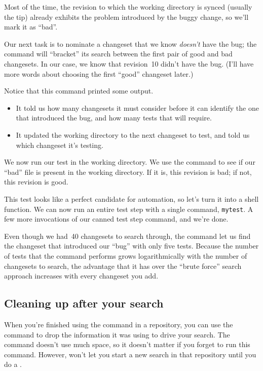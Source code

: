 Most of the time, the revision to which the working directory is
synced (usually the tip) already exhibits the problem introduced by
the buggy change, so we'll mark it as ``bad''.

Our next task is to nominate a changeset that we know \emph{doesn't}
have the bug; the  command will ``bracket'' its search
between the first pair of good and bad changesets.  In our case, we
know that revision~10 didn't have the bug.  (I'll have more words
about choosing the first ``good'' changeset later.)

Notice that this command printed some output.
\begin{itemize}
\item It told us how many changesets it must consider before it can
  identify the one that introduced the bug, and how many tests that
  will require.
\item It updated the working directory to the next changeset to test,
  and told us which changeset it's testing.
\end{itemize}

We now run our test in the working directory.  We use the
 command to see if our ``bad'' file is present in the
working directory.  If it is, this revision is bad; if not, this
revision is good.

This test looks like a perfect candidate for automation, so let's turn
it into a shell function.
We can now run an entire test step with a single command,
\texttt{mytest}.
A few more invocations of our canned test step command, and we're
done.

Even though we had~40 changesets to search through, the 
command let us find the changeset that introduced our ``bug'' with
only five tests.  Because the number of tests that the 
command performs grows logarithmically with the number of changesets to
search, the advantage that it has over the ``brute force'' search
approach increases with every changeset you add.

\subsection{Cleaning up after your search}

When you're finished using the  command in a
repository, you can use the  command to drop
the information it was using to drive your search.  The command
doesn't use much space, so it doesn't matter if you forget to run this
command.  However,  won't let you start a new search in
that repository until you do a .

